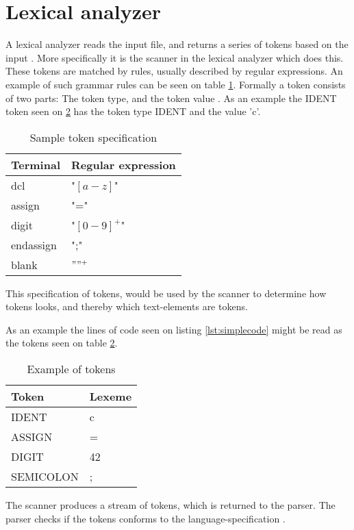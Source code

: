 \section{Lexical analyzer}
A lexical analyzer reads the input file, and returns a series of tokens based on the input \citep{CraftingACompiler}. More specifically it is the scanner in the lexical analyzer which does this. These tokens are matched by rules, usually described by regular expressions. An example of such grammar rules can be seen on table \ref{tab:tokenspecification}. Formally a token consists of two parts: The token type, and the token value \citep{CraftingACompiler}. As an example the IDENT token seen on \ref{tab:tokensexample} has the token type IDENT and the value 'c'. 

\begin{table}[H]
\begin{tabular}{|l|l|}
\hline
    	Terminal  	& Regular expression 	\\ \hline
    	dcl       	& "$[a-z]$"      			\\ 
    	assign    	& "="      				\\ 
    	digit     	& "$[0-9]^+$"   			\\ 
    	endassign 	& ";"      				\\
    	blank 		& $" "^+$					\\
    \hline
\end{tabular}
\caption{Sample token specification}
\label{tab:tokenspecification}
\end{table}
This specification of tokens, would be used by the scanner to determine how tokens looks, and thereby which text-elements are tokens. 


As an example the lines of code seen on listing \ref{lst:simplecode} might be read as the tokens seen on table \ref{tab:tokensexample}.
\begin{table}[H]
\begin{tabular}{|l|l|}
\hline
    \textbf{Token}     &\textbf{Lexeme} \\ \hline
    IDENT     & c      \\ 
    ASSIGN    & =      \\ 
    DIGIT     & 42     \\ 
    SEMICOLON & ;      \\
    \hline
\end{tabular}
\caption{Example of tokens}
\label{tab:tokensexample}
\end{table}
The scanner produces a stream of tokens, which is returned to the parser. The parser checks if the tokens conforms to the language-specification \citep{CraftingACompiler}.